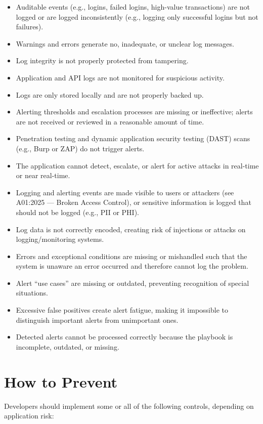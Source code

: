 \documentclass[11pt]{article}
\begin{document}
\begin{itemize}
  \item Auditable events (e.g., logins, failed logins, high-value transactions) are not logged or are logged inconsistently (e.g., logging only successful logins but not failures).
  \item Warnings and errors generate no, inadequate, or unclear log messages.
  \item Log integrity is not properly protected from tampering.
  \item Application and API logs are not monitored for suspicious activity.
  \item Logs are only stored locally and are not properly backed up.
  \item Alerting thresholds and escalation processes are missing or ineffective; alerts are not received or reviewed in a reasonable amount of time.
  \item Penetration testing and dynamic application security testing (DAST) scans (e.g., Burp or ZAP) do not trigger alerts.
  \item The application cannot detect, escalate, or alert for active attacks in real-time or near real-time.
  \item Logging and alerting events are made visible to users or attackers (see A01:2025 --- Broken Access Control), or sensitive information is logged that should not be logged (e.g., PII or PHI).
  \item Log data is not correctly encoded, creating risk of injections or attacks on logging/monitoring systems.
  \item Errors and exceptional conditions are missing or mishandled such that the system is unaware an error occurred and therefore cannot log the problem.
  \item Alert ``use cases'' are missing or outdated, preventing recognition of special situations.
  \item Excessive false positives create alert fatigue, making it impossible to distinguish important alerts from unimportant ones.
  \item Detected alerts cannot be processed correctly because the playbook is incomplete, outdated, or missing.
\end{itemize}

\section{How to Prevent}
Developers should implement some or all of the following controls, depending on application risk:
\end{document}
